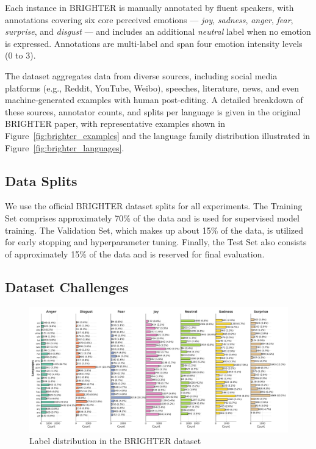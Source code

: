 \documentclass[a4paper,12pt]{extarticle}
\begin{document}
Each instance in BRIGHTER is manually annotated by fluent speakers, with annotations covering six core perceived emotions — \textit{joy}, \textit{sadness}, \textit{anger}, \textit{fear}, \textit{surprise}, and \textit{disgust} — and includes an additional \textit{neutral} label when no emotion is expressed. Annotations are multi-label and span four emotion intensity levels (0 to 3).

The dataset aggregates data from diverse sources, including social media platforms (e.g., Reddit, YouTube, Weibo), speeches, literature, news, and even machine-generated examples with human post-editing. A detailed breakdown of these sources, annotator counts, and splits per language is given in the original BRIGHTER paper, with representative examples shown in Figure~\ref{fig:brighter_examples} and the language family distribution illustrated in Figure~\ref{fig:brighter_languages}.

\subsection{Data Splits}
We use the official BRIGHTER dataset splits for all experiments. The Training Set comprises approximately 70\% of the data and is used for supervised model training. The Validation Set, which makes up about 15\% of the data, is utilized for early stopping and hyperparameter tuning. Finally, the Test Set also consists of approximately 15\% of the data and is reserved for final evaluation.

\subsection{Dataset Challenges}

\begin{figure}[h]
    \centering
    \includegraphics[width=1\textwidth]{brighter_label_distribution.png}
    \caption{Label distribution in the BRIGHTER dataset}
    \label{fig:brighter_label_distribution}
\end{figure}
\end{document}
